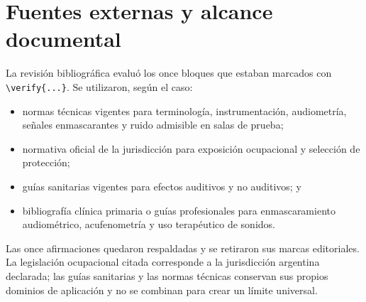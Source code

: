 \section{Fuentes externas y alcance documental}
\label{sec:u10-fuentes}

La revisión bibliográfica evaluó los once bloques que estaban marcados con
\verb|\verify{...}|. Se utilizaron, según el caso:
\begin{itemize}
    \item normas técnicas vigentes para terminología, instrumentación,
    audiometría, señales enmascarantes y ruido admisible en salas de prueba;
    \item normativa oficial de la jurisdicción para exposición ocupacional y
    selección de protección;
    \item guías sanitarias vigentes para efectos auditivos y no auditivos; y
    \item bibliografía clínica primaria o guías profesionales para
    enmascaramiento audiométrico, acufenometría y uso terapéutico de sonidos.
\end{itemize}

Las once afirmaciones quedaron respaldadas y se retiraron sus marcas
editoriales. La legislación ocupacional citada corresponde a la jurisdicción
argentina declarada; las guías sanitarias y las normas técnicas conservan sus
propios dominios de aplicación y no se combinan para crear un límite
universal.
